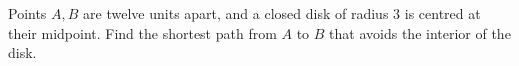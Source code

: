 Points $A,B$ are twelve units apart, and a closed disk of radius $3$ is centred at their midpoint. Find the shortest path from $A$ to $B$ that avoids the interior of the disk.
